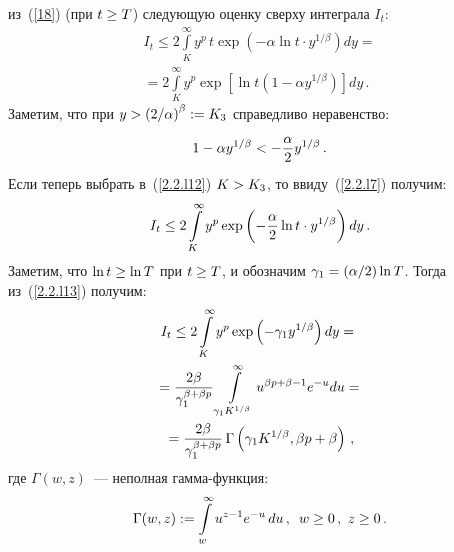 \begin{multicols}{2}
из~(\ref{18})  (при $t\hm\geq T$) следующую оценку сверху интеграла
$I_t$:
\begin{multline}
I_t \leq 2 \int\limits_{K}^\infty y^p\, t\exp\left( - \alpha
\ln t \cdot y^{1/\beta}\right)dy={}\\
{}= 2\int\limits_{K}^\infty y^p\exp\left[ \ln t
\left(1-\alpha y^{1/\beta} \right)
\right]dy\,. \label{2.2.l12}
\end{multline}
Заметим, что при $y\hm>\left({2}/{\alpha}\right)^\beta :=K_3$
справедливо неравенство:
\begin{equation}
\label{2.2.l7}
1-\alpha y^{1/\beta} < -\displaystyle\frac{\displaystyle \alpha\mathstrut}{\displaystyle 2\mathstrut}y^{1/\beta}\,.
\end{equation}
Если теперь выбрать в~(\ref{2.2.l12}) $K\hm>K_3$, то ввиду~(\ref{2.2.l7}) получим:
\begin{equation}
I_t \leq  2\int\limits_{K}^\infty y^p\exp\left( -\displaystyle\frac{\displaystyle \alpha\mathstrut}{\displaystyle 2\mathstrut} \ln t
\cdot y^{1/\beta}\right)dy\,. \label{2.2.l13}
\end{equation}
Заметим, что $\ln t \hm\geq  \ln T$ при $t \hm\geq T$, и обозначим
$\gamma_1\hm=({\alpha}/{2})\ln T$. Тогда  из~(\ref{2.2.l13}) получим:
\begin{multline}
I_t \leq  2\int\limits_{K}^\infty y^p\exp\left( -\gamma_1 y^{1/\beta}\right)dy={}\\
{}= \displaystyle\frac{\displaystyle 2\beta\mathstrut}{\displaystyle \gamma_1^{\beta+\beta p}\mathstrut}\int\limits_{\gamma_1
K^{1/\beta}}^\infty u^{\beta p+\beta-1}e^{-u}du={}\\
{}=\displaystyle\frac{\displaystyle 2\beta\mathstrut}{\displaystyle \gamma_1^{\beta+\beta p}\mathstrut}\, \Gamma\left(\gamma_1
K^{1/\beta},\beta p+\beta \right)\,,\label{2.2.l10}
\end{multline}
где $\Gamma(w,z)$~--- неполная гам\-ма-функ\-ция:
$$
\Gamma(w,z):=\int\limits_w^\infty u^{z-1}e^{-u}\,du\,, \enskip w\ge 0\,,\ z \geq 0\,.
$$



\end{multicols}
